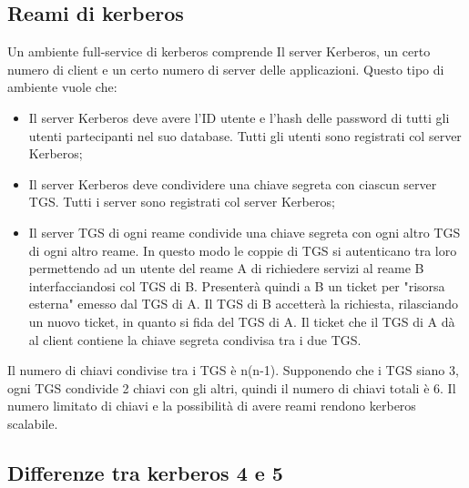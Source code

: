 \subsection{Reami di kerberos}

Un ambiente full-service di kerberos comprende Il server Kerberos, un certo numero di client e un certo numero di server delle applicazioni. Questo tipo di ambiente vuole che:
\begin{itemize}
    \item Il server Kerberos deve avere l'ID utente e l'hash delle password di tutti gli utenti partecipanti nel suo database. Tutti gli utenti sono registrati col server Kerberos;
	\item Il server Kerberos deve condividere una chiave segreta con ciascun server TGS. Tutti i server sono registrati col server Kerberos;
	\item Il server TGS di ogni reame condivide una chiave segreta con ogni altro TGS di ogni altro reame. In questo modo le coppie di TGS si autenticano tra loro permettendo ad un utente del reame A di richiedere servizi al reame B interfacciandosi col TGS di B. Presenterà quindi a B un ticket per "risorsa esterna" emesso dal TGS di A. Il TGS di B accetterà la richiesta, rilasciando un nuovo ticket, in quanto si fida del TGS di A.
	Il ticket che il TGS di A dà al client contiene la chiave segreta condivisa tra i due TGS.
\end{itemize}
	
Il numero di chiavi condivise tra i TGS è n(n-1). Supponendo che i TGS siano 3, ogni TGS condivide 2 chiavi con gli altri, quindi il numero di chiavi totali è 6. 
Il numero limitato di chiavi e la possibilità di avere reami rendono kerberos scalabile.

\subsection{Differenze tra kerberos 4 e 5}

